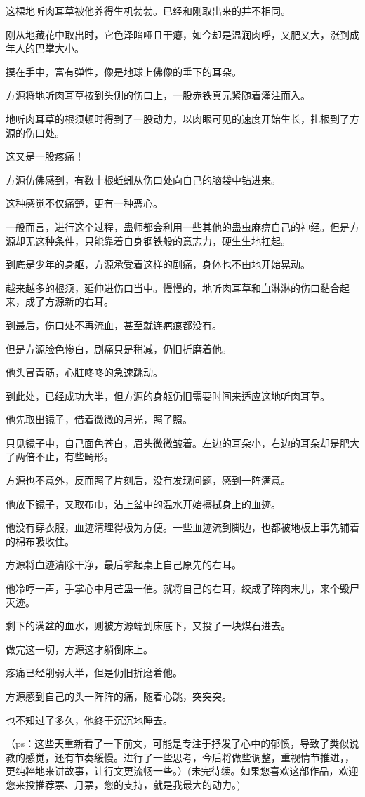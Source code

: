 \begin{this_body}
这棵地听肉耳草被他养得生机勃勃。已经和刚取出来的并不相同。

刚从地藏花中取出时，它色泽暗哑且干瘪，如今却是温润肉呼，又肥又大，涨到成年人的巴掌大小。

摸在手中，富有弹性，像是地球上佛像的垂下的耳朵。

方源将地听肉耳草按到头侧的伤口上，一股赤铁真元紧随着灌注而入。

地听肉耳草的根须顿时得到了一股动力，以肉眼可见的速度开始生长，扎根到了方源的伤口处。

这又是一股疼痛！

方源仿佛感到，有数十根蚯蚓从伤口处向自己的脑袋中钻进来。

这种感觉不仅痛楚，更有一种恶心。

一般而言，进行这个过程，蛊师都会利用一些其他的蛊虫麻痹自己的神经。但是方源却无这种条件，只能靠着自身钢铁般的意志力，硬生生地扛起。

到底是少年的身躯，方源承受着这样的剧痛，身体也不由地开始晃动。

越来越多的根须，延伸进伤口当中。慢慢的，地听肉耳草和血淋淋的伤口黏合起来，成了方源新的右耳。

到最后，伤口处不再流血，甚至就连疤痕都没有。

但是方源脸色惨白，剧痛只是稍减，仍旧折磨着他。

他头冒青筋，心脏咚咚的急速跳动。

到此处，已经成功大半，但方源的身躯仍旧需要时间来适应这地听肉耳草。

他先取出镜子，借着微微的月光，照了照。

只见镜子中，自己面色苍白，眉头微微皱着。左边的耳朵小，右边的耳朵却是肥大了两倍不止，有些畸形。

方源也不意外，反而照了片刻后，没有发现问题，感到一阵满意。

他放下镜子，又取布巾，沾上盆中的温水开始擦拭身上的血迹。

他没有穿衣服，血迹清理得极为方便。一些血迹流到脚边，也都被地板上事先铺着的棉布吸收住。

方源将血迹清除干净，最后拿起桌上自己原先的右耳。

他冷哼一声，手掌心中月芒蛊一催。就将自己的右耳，绞成了碎肉末儿，来个毁尸灭迹。

剩下的满盆的血水，则被方源端到床底下，又投了一块煤石进去。

做完这一切，方源这才躺倒床上。

疼痛已经削弱大半，但是仍旧折磨着他。

方源感到自己的头一阵阵的痛，随着心跳，突突突。

也不知过了多久，他终于沉沉地睡去。

（ps：这些天重新看了一下前文，可能是专注于抒发了心中的郁愤，导致了类似说教的感觉，还有节奏缓慢。进行了一些思考，今后将做些调整，重视情节推进，，更纯粹地来讲故事，让行文更流畅一些。）(未完待续。如果您喜欢这部作品，欢迎您来投推荐票、月票，您的支持，就是我最大的动力。)

\end{this_body}

